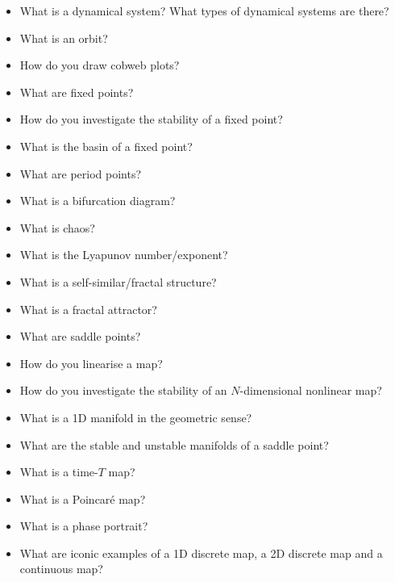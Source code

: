 \begin{itemize}
\item What is a dynamical system? What types of dynamical systems are there?
\item What is an orbit?
\item How do you draw cobweb plots?
\item What are fixed points?
\item How do you investigate the stability of a fixed point?
\item What is the basin of a fixed point?
\item What are period points?
\item What is a bifurcation diagram?
\item What is chaos?
\item What is the Lyapunov number/exponent?
\item What is a self-similar/fractal structure? 
\item What is a fractal attractor?
\item What are saddle points?
\item How do you linearise a map? 
\item How do you investigate the stability of an $N$-dimensional nonlinear map? 
\item What is a 1D manifold in the geometric sense?
\item What are the stable and unstable manifolds of a saddle point?
\item What is a time-$T$ map?
\item What is a Poincar\'{e} map?
\item What is a phase portrait?
\item What are iconic examples of a 1D discrete map, a 2D discrete map and a continuous map?
\end{itemize}



